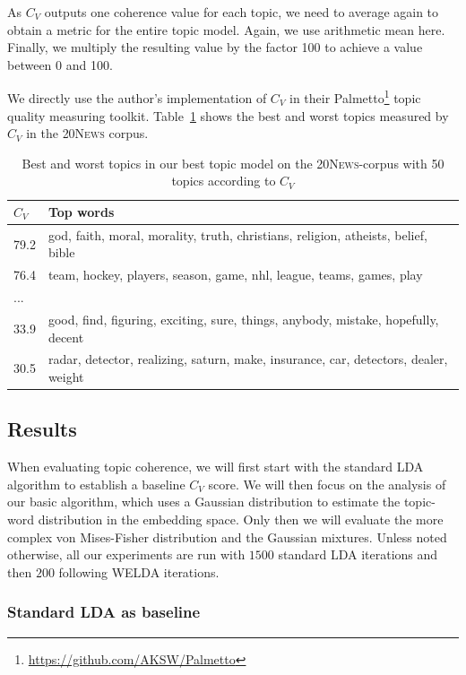 \documentclass[
        a4paper,
        titlepage,
        twoside,
        parskip,
        numbers=noenddot
        ]{scrbook}
\newcommand{\ra}[1]{\renewcommand{\arraystretch}{#1}}
\theoremstyle{break}
\begin{document}
As $C_V$ outputs one coherence value for each topic, we need to average again to obtain a metric for the entire topic model.
Again, we use arithmetic mean here.
Finally, we multiply the resulting value by the factor 100 to achieve a value between 0 and 100.

We directly use the author's implementation of $C_V$ in their Palmetto\footnote{\url{https://github.com/AKSW/Palmetto}} topic quality measuring toolkit.
Table~\ref{table:best_worst_cv_topics} shows the best and worst topics measured by $C_V$ in the \textsc{20News} corpus.
\begin{table}[]
  \ra{1.15}
  \centering
  \caption{Best and worst topics in our best topic model on the \textsc{20News}-corpus with 50 topics according to $C_V$}
  \begin{tabular}{ll}
  \toprule
  $C_V$ & Top words \\ \midrule
  79.2               & god, faith, moral, morality, truth, christians, religion, atheists, belief, bible \\
  76.4               & team, hockey, players, season, game, nhl, league, teams, games, play \\
  ...                &                    \\
  33.9               & good, find, figuring, exciting, sure, things, anybody, mistake, hopefully, decent \\
  30.5               & radar, detector, realizing, saturn, make, insurance, car, detectors, dealer, weight \\ \bottomrule
  \end{tabular}
  \label{table:best_worst_cv_topics}
\end{table}

\subsection{Results}

When evaluating topic coherence, we will first start with the standard LDA algorithm to establish a baseline $C_V$ score.
We will then focus on the analysis of our basic algorithm, which uses a Gaussian distribution to estimate the topic-word distribution in the embedding space.
Only then we will evaluate the more complex von Mises-Fisher distribution and the Gaussian mixtures.
Unless noted otherwise, all our experiments are run with $1500$ standard LDA iterations and then $200$ following WELDA iterations.

\subsubsection{Standard LDA as baseline}
\label{sec:lda_as_baseline}
\end{document}
